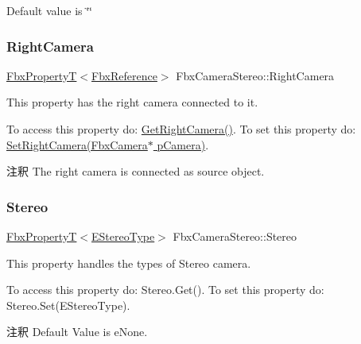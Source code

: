 Default value is \char`\"{}\char`\"{} \mbox{\label{class_fbx_camera_stereo_ae4bbaad53a1ebbc0534f78c246affd84}} 
\subsubsection{\texorpdfstring{Right\+Camera}{RightCamera}}
{\footnotesize\ttfamily \hyperlink{class_fbx_property_t}{Fbx\+PropertyT}$<$\hyperlink{fbxtypes_8h_a44df6a2eec915cf27cd481e5c5e48a24}{Fbx\+Reference}$>$ Fbx\+Camera\+Stereo\+::\+Right\+Camera}

This property has the right camera connected to it.

To access this property do\+: \hyperlink{class_fbx_camera_stereo_a8c293c596ad0c3b9fb169bdf5b508a68}{Get\+Right\+Camera()}. To set this property do\+: \hyperlink{class_fbx_camera_stereo_a9b37a67b3bf1e94a6845077913083d78}{Set\+Right\+Camera(\+Fbx\+Camera$\ast$ p\+Camera)}.

\begin{DoxyRemark}{注釈}
The right camera is connected as source object. 
\end{DoxyRemark}
\mbox{\label{class_fbx_camera_stereo_af7ab718dda255c4673813f0993cd143f}} 
\subsubsection{\texorpdfstring{Stereo}{Stereo}}
{\footnotesize\ttfamily \hyperlink{class_fbx_property_t}{Fbx\+PropertyT}$<$\hyperlink{class_fbx_camera_stereo_acb0f27675a73de0858983b703196cb37}{E\+Stereo\+Type}$>$ Fbx\+Camera\+Stereo\+::\+Stereo}

This property handles the types of Stereo camera.

To access this property do\+: Stereo.\+Get(). To set this property do\+: Stereo.\+Set(\+E\+Stereo\+Type).

\begin{DoxyRemark}{注釈}
Default Value is e\+None. 
\end{DoxyRemark}
\mbox{\label{class_fbx_camera_stereo_ad869c71fad3c11ada97b96bceeda09ed}} 
